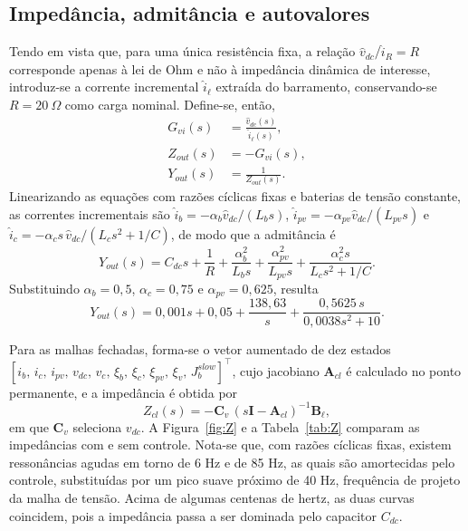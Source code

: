 \subsection{Impedância, admitância e autovalores}

Tendo em vista que, para uma única resistência fixa, a relação $\hat v_{dc}/\hat i_R=R$ corresponde apenas à lei de Ohm e não à impedância dinâmica de interesse, introduz-se a corrente incremental $\hat i_\ell$ extraída do barramento, conservando-se $R=20\ \Omega$ como carga nominal. Define-se, então,
\begin{align}
G_{vi}(s)&=\frac{\hat v_{dc}(s)}{\hat i_\ell(s)},\\
Z_{out}(s)&=-G_{vi}(s),\\
Y_{out}(s)&=\frac{1}{Z_{out}(s)}.
\end{align}
Linearizando as equações com razões cíclicas fixas e baterias de tensão constante, as correntes incrementais são $\hat i_b=-\alpha_b\hat v_{dc}/(L_bs)$, $\hat i_{pv}=-\alpha_{pv}\hat v_{dc}/(L_{pv}s)$ e $\hat i_c=-\alpha_cs\,\hat v_{dc}/(L_cs^2+1/C)$, de modo que a admitância é
\begin{equation}
Y_{out}(s)=C_{dc}s+\frac1R+\frac{\alpha_b^2}{L_bs}+\frac{\alpha_{pv}^2}{L_{pv}s}+\frac{\alpha_c^2s}{L_cs^2+1/C}.
\label{eq:Y}
\end{equation}
Substituindo $\alpha_b=0{,}5$, $\alpha_c=0{,}75$ e $\alpha_{pv}=0{,}625$, resulta
\begin{equation}
Y_{out}(s)=0{,}001s+0{,}05+\frac{138{,}63}{s}+\frac{0{,}5625\,s}{0{,}0038s^2+10}.
\end{equation}

Para as malhas fechadas, forma-se o vetor aumentado de dez estados $[i_b,\,i_c,\,i_{pv},\,v_{dc},\,v_c,\,\xi_b,\,\xi_c,\,\xi_{pv},\,\xi_v,\,J_b^{slow}]^\top$, cujo jacobiano $\mathbf{A}_{cl}$ é calculado no ponto permanente, e a impedância é obtida por
\begin{equation}
Z_{cl}(s)=-\mathbf{C}_v\,(s\mathbf{I}-\mathbf{A}_{cl})^{-1}\mathbf{B}_\ell,
\end{equation}
em que $\mathbf{C}_v$ seleciona $v_{dc}$. A Figura~\ref{fig:Z} e a Tabela~\ref{tab:Z} comparam as impedâncias com e sem controle. Nota-se que, com razões cíclicas fixas, existem ressonâncias agudas em torno de 6 Hz e de 85 Hz, as quais são amortecidas pelo controle, substituídas por um pico suave próximo de 40 Hz, frequência de projeto da malha de tensão. Acima de algumas centenas de hertz, as duas curvas coincidem, pois a impedância passa a ser dominada pelo capacitor $C_{dc}$.

